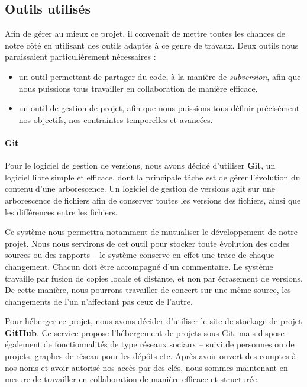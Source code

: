\subsection{Outils utilisés}
Afin de gérer au mieux ce projet, il convenait de mettre toutes les chances de notre côté en utilisant des outils adaptés à ce genre de travaux. Deux outils nous paraissaient particulièrement nécessaires :
\begin{itemize}
  \item un outil permettant de partager du code, à la manière de \textit{subversion}, afin que nous puissions tous travailler en collaboration de manière efficace,
  \item un outil de gestion de projet, afin que nous puissions tous définir précisément nos objectifs, nos contraintes temporelles et avancées.
\end{itemize}

\paragraph*{Git\\}
\medskip Pour le logiciel de gestion de versions, nous avons décidé d'utiliser \textbf{Git}, un logiciel libre simple et efficace, dont la principale tâche est de gérer l'évolution du contenu d'une arborescence. Un logiciel de gestion de versions agit sur une arborescence de fichiers afin de conserver toutes les versions des fichiers, ainsi que les différences entre les fichiers.

Ce système nous permettra notamment de mutualiser le développement de notre projet. Nous nous servirons de cet outil pour stocker toute évolution des codes sources ou des rapports -- le système conserve en effet une trace de chaque changement. Chacun doit être accompagné d'un commentaire. Le système travaille par fusion de copies locale et distante, et non par écrasement de versions. De cette manière, nous pourrons travailler de concert sur une même source, les changements de l'un n'affectant pas ceux de l'autre.

Pour héberger ce projet, nous avons décider d'utiliser le site de stockage de projet \textbf{GitHub}. Ce service propose l'hébergement de projets sous Git, mais dispose également de fonctionnalités de type réseaux sociaux -- suivi de personnes ou de projets, graphes de réseau pour les dépôts etc. Après avoir ouvert des comptes à nos noms et avoir autorisé nos accès par des clés, nous sommes maintenant en mesure de travailler en collaboration de manière efficace et structurée.


